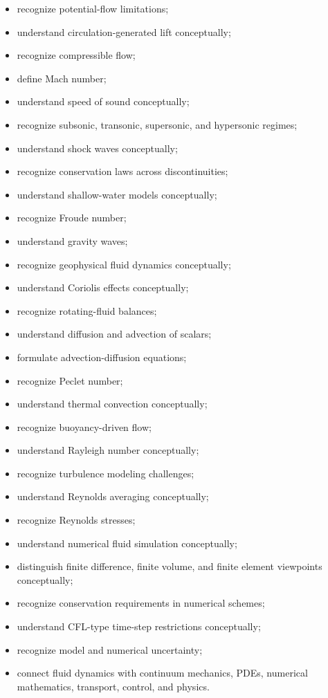 {\begin{itemize}
    \item recognize potential-flow limitations;
    \item understand circulation-generated lift conceptually;
    \item recognize compressible flow;
    \item define Mach number;
    \item understand speed of sound conceptually;
    \item recognize subsonic, transonic, supersonic, and hypersonic regimes;
    \item understand shock waves conceptually;
    \item recognize conservation laws across discontinuities;
    \item understand shallow-water models conceptually;
    \item recognize Froude number;
    \item understand gravity waves;
    \item recognize geophysical fluid dynamics conceptually;
    \item understand Coriolis effects conceptually;
    \item recognize rotating-fluid balances;
    \item understand diffusion and advection of scalars;
    \item formulate advection-diffusion equations;
    \item recognize Peclet number;
    \item understand thermal convection conceptually;
    \item recognize buoyancy-driven flow;
    \item understand Rayleigh number conceptually;
    \item recognize turbulence modeling challenges;
    \item understand Reynolds averaging conceptually;
    \item recognize Reynolds stresses;
    \item understand numerical fluid simulation conceptually;
    \item distinguish finite difference, finite volume, and finite element
          viewpoints conceptually;
    \item recognize conservation requirements in numerical schemes;
    \item understand CFL-type time-step restrictions conceptually;
    \item recognize model and numerical uncertainty;
    \item connect fluid dynamics with continuum mechanics, PDEs,
          numerical mathematics, transport, control, and physics.
\end{itemize}
}

